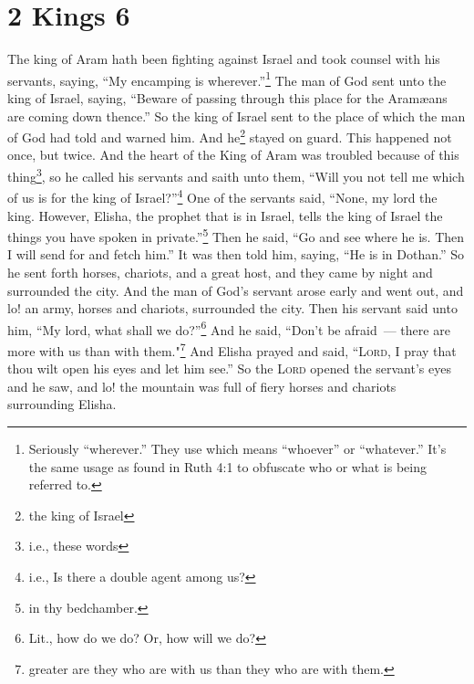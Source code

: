 \section{2 Kings 6}\label{2 Kings 6}
\begin{enumerate}[align=center]
     The king of Aram hath been fighting against Israel and took counsel with his servants, saying, ``My encamping is wherever.''\footnote{Seriously ``wherever.'' They use  which means ``whoever'' or ``whatever.'' It's the same usage as found in Ruth 4:1 to obfuscate who or what is being referred to.}%
     The man of God sent unto the king of Israel, saying, ``Beware of passing through this place for the Aram\ae{}ans are coming down thence.''%
     So the king of Israel sent to the place of which the man of God had told and warned him. And he\footnote{the king of Israel} stayed on guard. This happened not once, but twice.%
     And the heart of the King of Aram was troubled because of this thing\footnote{i.e., these words}, so he called his servants and saith unto them, ``Will you not tell me which of us is for the king of Israel?''\footnote{i.e., Is there a double agent among us?}%
     One of the servants said, ``None, my lord the king. However, Elisha, the prophet that is in Israel, tells the king of Israel the things you have spoken in private.''\footnote{in thy bedchamber.}%
     Then he said, ``Go and see where he is. Then I will send for and fetch him.'' It was then told him, saying, ``He is in Dothan.''%
     So he sent forth horses, chariots, and a great host, and they came by night and surrounded the city.%
     And the man of God's servant arose early and went out, and lo! an army, horses and chariots, surrounded the city. Then his servant said unto him, ``My lord, what shall we do?''\footnote{Lit., how do we do? Or, how will we do?}%
     And he said, ``Don't be afraid~--- there are more with us than with them."\footnote{greater are they who are with us than they who are with them.}%
     And Elisha prayed and said, ``\textsc{Lord}, I pray that thou wilt open his eyes and let him see.'' So the \textsc{Lord} opened the servant's eyes and he saw, and lo! the mountain was full of fiery horses and chariots surrounding Elisha.%
\end{enumerate}
